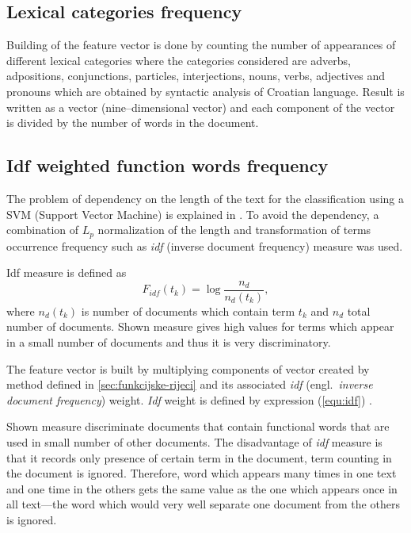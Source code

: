 \documentclass[11pt,english]{article}
\newcommand{\engl}[1]{(engl.~\emph{#1})}
\begin{document}
\begin{multicols}{2}
\subsection{Lexical categories frequency}
\label{sec:rijeci-grupe}
Building of the feature vector is done by counting the number of appearances of
different lexical categories where the categories considered are adverbs,
adpositions, conjunctions, particles, interjections, nouns, verbs, adjectives and
pronouns which are obtained by syntactic analysis of Croatian language. Result is
written as a vector (nine--dimensional vector) and each component of the vector
is divided by the number of words in the document.

\subsection{Idf weighted function words frequency}
\label{sec:funkcijske-rijeci-idf}
The problem of dependency on the length of the text for the classification using
a SVM (Support Vector Machine) is explained in \citep{diederich2003authorship}.
To avoid the dependency, a combination of $L_p$ normalization of the
length and transformation of terms occurrence frequency such as \emph{idf}
(inverse document frequency) measure was used.

Idf measure is defined as
\begin{equation}
F_{idf}(t_k) = \log \frac{n_d}{n_d(t_k)},
\label{equ:idf}
\end{equation}
where $n_d(t_k)$ is number of documents which contain term $t_k$ and $n_d$
total number of documents. Shown measure gives high values for terms which
appear in a small number of documents and thus it is very discriminatory.

The feature vector is built by multiplying components of vector created by method
defined in \ref{sec:funkcijske-rijeci} and its associated \emph{idf}
\engl{inverse document frequency} weight. \emph{Idf} weight is defined by
expression (\ref{equ:idf}) \citep{diederich2003authorship}.

Shown measure discriminate documents that contain functional words that are used
in small number of other documents. The disadvantage of \emph{idf} measure is
that it records only presence of certain term in the document, term
counting in the document is ignored. Therefore, word which appears many times in
one text and one time in the others gets the same value as the one which appears
once in all text---the word which would very well separate one document from the
others is ignored.


\end{multicols}
\end{document}
